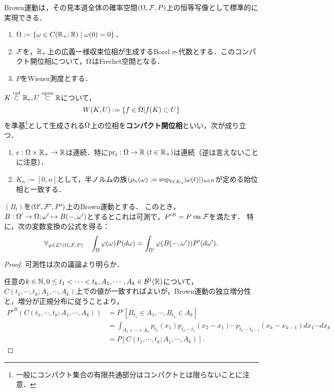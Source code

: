 \documentclass[uplatex,dvipdfmx]{jsreport}
\begin{document}
\begin{tcolorbox}[colframe=ForestGreen, colback=ForestGreen!10!white,breakable,colbacktitle=ForestGreen!40!white,coltitle=black,fonttitle=\bfseries\sffamily,
title=]
    Brown運動は，その見本道全体の確率空間$(\Omega,\mathcal{F},P)$上の恒等写像として標準的に実現できる．
\end{tcolorbox}

\begin{definition}\mbox{}
    \begin{enumerate}
        \item $\Omega:=\left\{\omega\in C(\mathbb{R}_+;\mathbb{R})\mid\omega(0)=0\right\}$．
        \item $\mathcal{F}$を，$\mathbb{R}_+$上の広義一様収束位相が生成するBorel $\sigma$-代数とする．このコンパクト開位相について，$\Omega$はFrechet空間となる．
        \item $P$をWiener測度とする．
    \end{enumerate}
\end{definition}

\begin{lemma}[コンパクト開位相の性質]
    $K\overset{\textrm{cpt}}{\subset}\mathbb{R}_*,U\overset{\mathrm{open}}{\subset}\mathbb{R}$について，
    \[W(K,U):=\left\{f\in\Omega| f(K)\subset U\right\}\]
    を準基\footnote{一般にコンパクト集合の有限共通部分はコンパクトとは限らないことに注意．}として生成される$\Omega$上の位相を\textbf{コンパクト開位相}といい，次が成り立つ．
    \begin{enumerate}
        \item $e:\Omega\times\mathbb{R}_+\to\mathbb{R}$は連続．特に$\mathrm{pr}_t:\Omega\to\mathbb{R}\;(t\in\mathbb{R}_+)$は連続（逆は言えないことに注意）．
        \item $K_n:=[0,n]$として，半ノルムの族$(\rho_n(\omega):=\sup_{t\in K_n}\lvert\omega(t)\rvert)_{n\in\mathbb{N}}$が定める始位相と一致する．
    \end{enumerate}
\end{lemma}

\begin{lemma}[Wiener測度の特徴付け]
    $(B_t)$を$(\Omega',\mathcal{F}',P')$上のBrown運動とする．
    このとき，$B:\Omega'\to\Omega;\omega'\mapsto B(-,\omega')$とするとこれは可測で，$P'^B=P\;\mathrm{on}\;\mathcal{F}$を満たす．
    特に，次の変数変換の公式を得る：
    \[\forall_{\varphi\in\mathcal{L}^1(\Omega,\mathcal{F},P)}\quad\int_\Omega\varphi(\omega)P(d\omega)=\int_{\Omega'}\varphi(B(-,\omega'))P'(d\omega').\]
\end{lemma}
\begin{proof}
    可測性は次の議論より明らか．

    任意の$k\in\mathbb{N},0\le t_1<\cdots<t_k,A_1,\cdots,A_k\in\mathcal{B}^1(\mathbb{R})$について，$C(t_1,\cdots,t_k;A_1,\cdots,A_k)$上での値が一致すればよいが，Brown運動の独立増分性と，増分が正規分布に従うことより，
    \begin{align*}
        P'^B(C(t_1,\cdots,t_k;A_1,\cdots,A_k))&=P'[B_{t_1}\in A_1,\cdots,B_{t_k}\in A_k]\\
        &=\int_{A_1\times\cdots\times A_k}p_{t_1}(x_1)p_{t_2-t_1}(x_2-x_1)\cdots p_{t_k-t_{k-1}}(x_k-x_{k-1})dx_1\cdots dx_k\\
        &=P[C(t_1,\cdots,t_k;A_1,\cdots,A_k)].
    \end{align*}
\end{proof}
\end{document}
